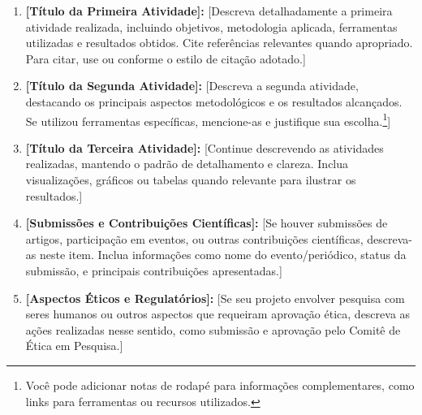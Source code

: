 \begin{enumerate}
    \item [\textbf{i.}] \textbf{[Título da Primeira Atividade]:} 
    [Descreva detalhadamente a primeira atividade realizada, incluindo 
    objetivos, metodologia aplicada, ferramentas utilizadas e resultados 
    obtidos. Cite referências relevantes quando apropriado. Para citar, use \cite{autor2022_dissert} ou  conforme o estilo de citação adotado.] 

    
    \item [\textbf{ii.}] \textbf{[Título da Segunda Atividade]:} 
    [Descreva a segunda atividade, destacando os principais aspectos 
    metodológicos e os resultados alcançados. Se utilizou ferramentas 
    específicas, mencione-as e justifique sua escolha.\footnote{Você pode 
    adicionar notas de rodapé para informações complementares, como links 
    para ferramentas ou recursos utilizados.}]
    
    
    \item [\textbf{iii.}] \textbf{[Título da Terceira Atividade]:} 
    [Continue descrevendo as atividades realizadas, mantendo o padrão de 
    detalhamento e clareza. Inclua visualizações, gráficos ou tabelas 
    quando relevante para ilustrar os resultados.]
    
    \item [\textbf{iv.}] \textbf{[Submissões e Contribuições Científicas]:} 
    [Se houver submissões de artigos, participação em eventos, ou outras 
    contribuições científicas, descreva-as neste item. Inclua informações 
    como nome do evento/periódico, status da submissão, e principais 
    contribuições apresentadas.]
    
    \item [\textbf{v.}] \textbf{[Aspectos Éticos e Regulatórios]:} 
    [Se seu projeto envolver pesquisa com seres humanos ou outros aspectos 
    que requeiram aprovação ética, descreva as ações realizadas nesse 
    sentido, como submissão e aprovação pelo Comitê de Ética em Pesquisa.]
    
\end{enumerate}


